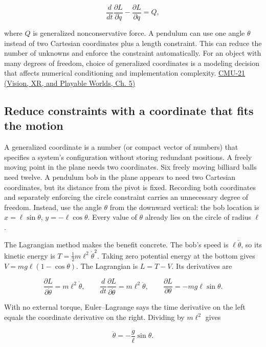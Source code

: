 \[
\frac{d}{dt}\frac{\partial L}{\partial\dot q}-\frac{\partial L}{\partial q}=Q,
\]

where \(Q\) is generalized nonconservative force. A pendulum can use one angle \(\theta\) instead of two Cartesian coordinates plus a length constraint. This can reduce the number of unknowns and enforce the constraint automatically. For an object with many degrees of freedom, choice of generalized coordinates is a modeling decision that affects numerical conditioning and implementation complexity. \href{../07-Vision-XR-and-Playable-Worlds/main.pdf\#nameddest=04-visual-computing-ii-ch036-cmu-21---dynamics-and-time-integration}{CMU-21 (Vision, XR, and Playable Worlds, Ch. 5)}

\subsection{Reduce constraints with a coordinate that fits the motion}\label{04-visual-computing-ii-ch029-reduce-constraints-with-a-coordinate-that-fits-the-motion}

A generalized coordinate is a number (or compact vector of numbers) that specifies a system's configuration without storing redundant positions. A freely moving point in the plane needs two coordinates. Six freely moving billiard balls need twelve. A pendulum bob in the plane appears to need two Cartesian coordinates, but its distance from the pivot is fixed. Recording both coordinates and separately enforcing the circle constraint carries an unnecessary degree of freedom. Instead, use the angle \(\theta\) from the downward vertical: the bob location is \(x=\ell\sin\theta\), \(y=-\ell\cos\theta\). Every value of \(\theta\) already lies on the circle of radius \(\ell\).

The Lagrangian method makes the benefit concrete. The bob's speed is \(\ell\dot\theta\), so its kinetic energy is \(T=\tfrac12m\ell^2\dot\theta^2\). Taking zero potential energy at the bottom gives \(V=mg\ell(1-\cos\theta)\). The Lagrangian is \(L=T-V\). Its derivatives are

\[
\frac{\partial L}{\partial\dot\theta}=m\ell^2\dot\theta,\qquad
\frac{d}{dt}\frac{\partial L}{\partial\dot\theta}=m\ell^2\ddot\theta,\qquad
\frac{\partial L}{\partial\theta}=-mg\ell\sin\theta.
\]

With no external torque, Euler--Lagrange says the time derivative on the left equals the coordinate derivative on the right. Dividing by \(m\ell^2\) gives

\[
\ddot\theta=-\frac{g}{\ell}\sin\theta.
\]

